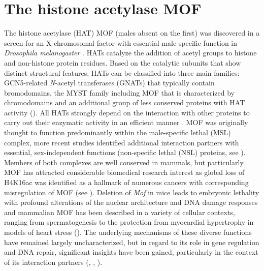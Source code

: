 \section{The histone acetylase MOF}
The histone acetylase (HAT) MOF (males absent on the first) was discovered in a screen for an X-chromosomal factor with essential male-specific function in \textit{Drosophila melano\-gaster} \citep{Hilfiker1997}. HATs catalyze the addition of acetyl groups to histone and non-histone protein residues. Based on the catalytic subunits that show distinct structural features, HATs can be classified into three main families: GCN5-related \textsl{N}-acetyl transferases (GNATs) that typically contain bromodomains, the MYST family including MOF that is characterized by chromodomains and an additional group of less conserved proteins with HAT activity (). All HATs strongly depend on the interaction with other proteins to carry out their enzymatic activity in an efficient manner \citep{Lee2007}. MOF was originally thought to function predominantly within the male-specific lethal (MSL) complex, more recent studies identified additional interaction partners with essential, sex-independent functions (non-specific lethal (NSL) proteins, see ). Members of both complexes are well conserved in mammals, but particularly MOF has attracted considerable biomedical research interest as global loss of H4K16ac was identified as a hallmark of numerous cancers with corresponding misregulation of MOF \citep{Fraga2005,Pfister2008} (see ). Deletion of \textit{Mof} in mice leads to embryonic lethality with profound alterations of the nuclear architecture and DNA damage responses \citep{Thomas2008,Gupta2008} and mammalian MOF has been described in a variety of cellular contexts, ranging from spermatogenesis to the protection from myocardial hypertrophy in models of heart stress (). The underlying mechanisms of these diverse functions have remained largely uncharacterized, but in regard to its role in gene regulation and DNA repair, significant insights have been gained, particularly in the context of its interaction partners (, , ).
